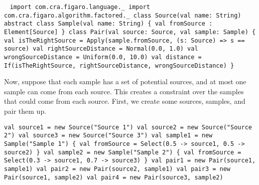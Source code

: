 \begin{flushleft}\
\texttt{import com.cra.figaro.language.\_
\newline import com.cra.figaro.algorithm.factored.\_
\newline 
\newline class Source(val name: String)
\newline 
\newline abstract class Sample(val name: String) \{
\newline \tab val fromSource : Element[Source]
\newline \}
\newline 
\newline class Pair(val source: Source, val sample: Sample) \{
\newline \tab val isTheRightSource =
\newline \tab Apply(sample.fromSource, (s: Source) => s == source)
\newline \tab val rightSourceDistance = Normal(0.0, 1.0) 
\newline \tab val wrongSourceDistance = Uniform(0.0, 10.0) 
\newline \tab val distance =
\newline \tab If(isTheRightSource, rightSourceDistance, wrongSourceDistance)
\newline \}
}
\end{flushleft}

Now, suppose that each sample has a set of potential sources, and at most one sample can come from each source. This creates a constraint over the samples that could come from each source.  First, we create some sources, samples, and pair them up.

\begin{flushleft}
\texttt{val source1 = new Source("Source 1") 
\newline val source2 = new Source("Source 2") 
\newline val source3 = new Source("Source 3") 
\newline val sample1 = new Sample("Sample 1") \{
\newline \tab val fromSource = Select(0.5 -> source1, 0.5 -> source2)
\newline \}
\newline 
\newline val sample2 = new Sample("Sample 2") \{
\newline \tab val fromSource = Select(0.3 -> source1, 0.7 -> source3)
\newline \}
\newline 
\newline val pair1 = new Pair(source1, sample1) 
\newline val pair2 = new Pair(source2, sample1) 
\newline val pair3 = new Pair(source1, sample2) 
\newline val pair4 = new Pair(source3, sample2)}
\end{flushleft}

